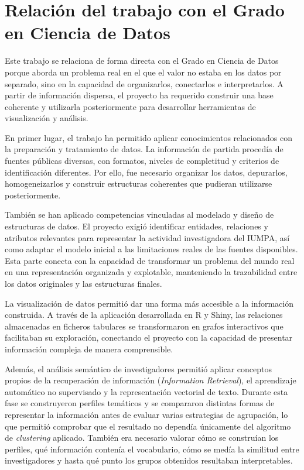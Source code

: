 \documentclass[11pt,spanish,listoffigures,listoftables]{tfgetsinf}
\begin{document}
\section{Relación del trabajo con el Grado en Ciencia de Datos}

Este trabajo se relaciona de forma directa con el Grado en Ciencia de Datos porque aborda un problema real en el que el valor no estaba en los datos por separado, sino en la capacidad de organizarlos, conectarlos e interpretarlos. A partir de información dispersa, el proyecto ha requerido construir una base coherente y utilizarla posteriormente para desarrollar herramientas de visualización y análisis.

En primer lugar, el trabajo ha permitido aplicar conocimientos relacionados con la preparación y tratamiento de datos. La información de partida procedía de fuentes públicas diversas, con formatos, niveles de completitud y criterios de identificación diferentes. Por ello, fue necesario organizar los datos, depurarlos, homogeneizarlos y construir estructuras coherentes que pudieran utilizarse posteriormente.

También se han aplicado competencias vinculadas al modelado y diseño de estructuras de datos. El proyecto exigió identificar entidades, relaciones y atributos relevantes para representar la actividad investigadora del IUMPA, así como adaptar el modelo inicial a las limitaciones reales de las fuentes disponibles. Esta parte conecta con la capacidad de transformar un problema del mundo real en una representación organizada y explotable, manteniendo la trazabilidad entre los datos originales y las estructuras finales.

La visualización de datos permitió dar una forma más accesible a la información construida. A través de la aplicación desarrollada en R y Shiny, las relaciones almacenadas en ficheros tabulares se transformaron en grafos interactivos que facilitaban su exploración, conectando el proyecto con la capacidad de presentar información compleja de manera comprensible.

Además, el análisis semántico de investigadores permitió aplicar conceptos propios de la recuperación de información (\textit{Information Retrieval}), el aprendizaje automático no supervisado y la representación vectorial de texto. Durante esta fase se construyeron perfiles temáticos y se compararon distintas formas de representar la información antes de evaluar varias estrategias de agrupación, lo que permitió comprobar que el resultado no dependía únicamente del algoritmo de \textit{clustering} aplicado. También era necesario valorar cómo se construían los perfiles, qué información contenía el vocabulario, cómo se medía la similitud entre investigadores y hasta qué punto los grupos obtenidos resultaban interpretables.
\end{document}
